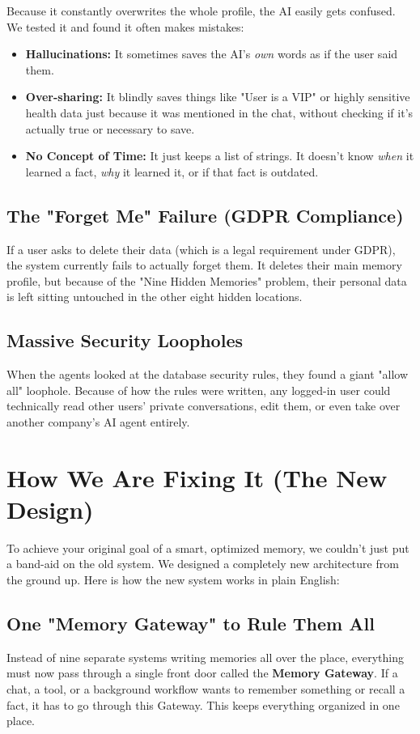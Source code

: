 \documentclass[12pt]{article}
\begin{document}
Because it constantly overwrites the whole profile, the AI easily gets confused. We tested it and found it often makes mistakes:
\begin{itemize}
    \item \textbf{Hallucinations:} It sometimes saves the AI's \textit{own} words as if the user said them.
    \item \textbf{Over-sharing:} It blindly saves things like "User is a VIP" or highly sensitive health data just because it was mentioned in the chat, without checking if it's actually true or necessary to save.
    \item \textbf{No Concept of Time:} It just keeps a list of strings. It doesn't know \textit{when} it learned a fact, \textit{why} it learned it, or if that fact is outdated.
\end{itemize}

\subsection{The "Forget Me" Failure (GDPR Compliance)}
If a user asks to delete their data (which is a legal requirement under GDPR), the system currently fails to actually forget them. It deletes their main memory profile, but because of the "Nine Hidden Memories" problem, their personal data is left sitting untouched in the other eight hidden locations. 

\subsection{Massive Security Loopholes}
When the agents looked at the database security rules, they found a giant "allow all" loophole. Because of how the rules were written, any logged-in user could technically read other users' private conversations, edit them, or even take over another company's AI agent entirely. 

\section{How We Are Fixing It (The New Design)}

To achieve your original goal of a smart, optimized memory, we couldn't just put a band-aid on the old system. We designed a completely new architecture from the ground up. Here is how the new system works in plain English:

\subsection{One "Memory Gateway" to Rule Them All}
Instead of nine separate systems writing memories all over the place, everything must now pass through a single front door called the \textbf{Memory Gateway}. If a chat, a tool, or a background workflow wants to remember something or recall a fact, it has to go through this Gateway. This keeps everything organized in one place.
\end{document}
